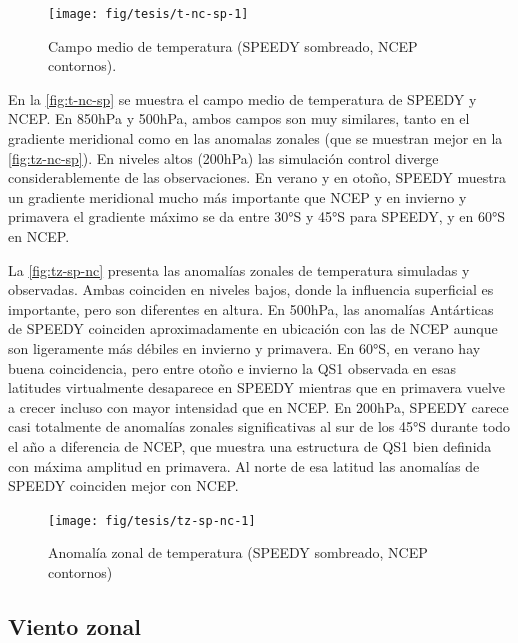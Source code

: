 \documentclass[spanish,a4paper,12pt,oneside]{book}
\begin{document}
\begin{landscape}\begin{figure}

{\centering \texttt{[image: fig/tesis/t-nc-sp-1]} 

}

\caption{Campo medio de temperatura (SPEEDY sombreado, NCEP contornos).}\label{fig:t-nc-sp}
\end{figure}
\end{landscape}

En la \autoref{fig:t-nc-sp} se muestra el campo medio de temperatura de
SPEEDY y NCEP. En 850hPa y 500hPa, ambos campos son muy similares, tanto
en el gradiente meridional como en las anomalas zonales (que se muestran
mejor en la \autoref{fig:tz-nc-sp}). En niveles altos (200hPa) las
simulación control diverge considerablemente de las observaciones. En
verano y en otoño, SPEEDY muestra un gradiente meridional mucho más
importante que NCEP y en invierno y primavera el gradiente máximo se da
entre 30°S y 45°S para SPEEDY, y en 60°S en NCEP.

La \autoref{fig:tz-sp-nc} presenta las anomalías zonales de temperatura
simuladas y observadas. Ambas coinciden en niveles bajos, donde la
influencia superficial es importante, pero son diferentes en altura. En
500hPa, las anomalías Antárticas de SPEEDY coinciden aproximadamente en
ubicación con las de NCEP aunque son ligeramente más débiles en invierno
y primavera. En 60°S, en verano hay buena coincidencia, pero entre otoño
e invierno la QS1 observada en esas latitudes virtualmente desaparece en
SPEEDY mientras que en primavera vuelve a crecer incluso con mayor
intensidad que en NCEP. En 200hPa, SPEEDY carece casi totalmente de
anomalías zonales significativas al sur de los 45°S durante todo el año
a diferencia de NCEP, que muestra una estructura de QS1 bien definida
con máxima amplitud en primavera. Al norte de esa latitud las anomalías
de SPEEDY coinciden mejor con NCEP.

\begin{landscape}\begin{figure}

{\centering \texttt{[image: fig/tesis/tz-sp-nc-1]} 

}

\caption{Anomalía zonal de temperatura (SPEEDY sombreado, NCEP contornos)}\label{fig:tz-sp-nc}
\end{figure}
\end{landscape}

\subsection{Viento zonal}\label{viento-zonal-1}
\end{document}
